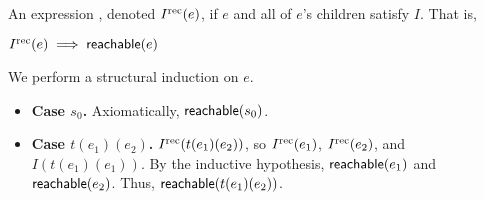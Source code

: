 \begin{definition}
  An expression , denoted $\Irec{e}$, if $e$
  and all of $e$'s children satisfy $I$. That is,
  \begin{mathpar}

  \end{mathpar}
\end{definition}

\begin{lemma}
  $\Irec{e} \implies \reachable{e}$
\end{lemma}
\begin{elidableproof}
  We perform a structural induction on $e$.
  \begin{itemize}
    \item \textbf{Case $s_0$.}
      Axiomatically, $\reachable{s_0}$.

    \item \textbf{Case $t(e_1)(e_2)$.}
      $\Irec{t(e_1)(e_2)}$, so $\Irec{e_1}$, $\Irec{e_2}$, and
      $I(t(e_1)(e_1))$. By the inductive hypothesis, $\reachable{e_1}$ and
      $\reachable{e_2}$. Thus, $\reachable{t(e_1)(e_2)}$.
  \end{itemize}
\end{elidableproof}

